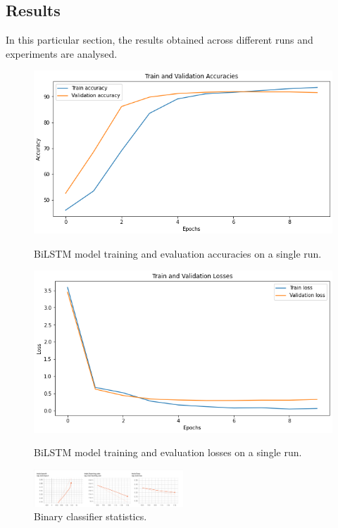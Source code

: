 \vspace{-0.25cm}
\subsection{Results}
\label{subsec:res}
In this particular section, the results obtained across different runs and experiments are analysed. 
\begin{figure}
    \centering
    \includegraphics[scale=0.28]{Images/singlerunacc.png}
    \vspace{-0.35cm}
    \caption{BiLSTM model training and evaluation accuracies on a single run.}
    \label{fig:singlerunacc}
    \includegraphics[scale=0.28]{Images/singlerunloss.png}
    \vspace{-0.35cm}
    \caption{BiLSTM model training and evaluation losses on a single run.}
    \label{fig:singlerunloss}
    \includegraphics[width=0.5\textwidth]{Images/BinaryCLF.png}
    \vspace{-0.35cm}
    \caption{Binary classifier statistics.}
    \label{fig:singleepoch}
\end{figure}

